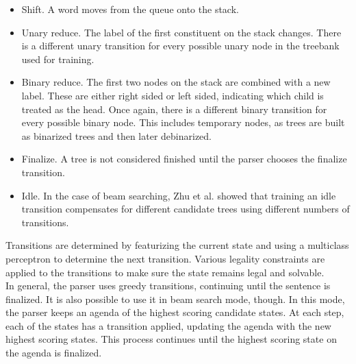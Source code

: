 \documentclass[a4paper,10pt]{article}
\begin{document}
 \begin{itemize}
  \item Shift. A word moves from the queue onto the stack.
  \item Unary reduce. The label of the first constituent on the stack changes. There is a different unary transition for every possible unary node in the treebank used for training.
  \item Binary reduce. The first two nodes on the stack are combined with a new label. These are either right sided or left sided, indicating which child is treated as the head. Once again, there is a different binary transition for every possible binary node. This includes temporary nodes, as trees are built as binarized trees and then later debinarized.
  \item Finalize. A tree is not considered finished until the parser chooses the finalize transition.
  \item Idle. In the case of beam searching, Zhu et al. showed that training an idle transition compensates for different candidate trees using different numbers of transitions.
 \end{itemize}
  
  Transitions are determined by featurizing the current state and using a multiclass perceptron to determine the next transition. Various legality constraints are applied to the transitions to make sure the state remains legal and solvable. \\
  In general, the parser uses greedy transitions, continuing until the sentence is finalized. It is also possible to use it in beam search mode, though. In this mode, the parser keeps an agenda of the highest scoring candidate states. At each step, each of the states has a transition applied, updating the agenda with the new highest scoring states. This process continues until the highest scoring state on the agenda is finalized.
 
 
\end{document}
